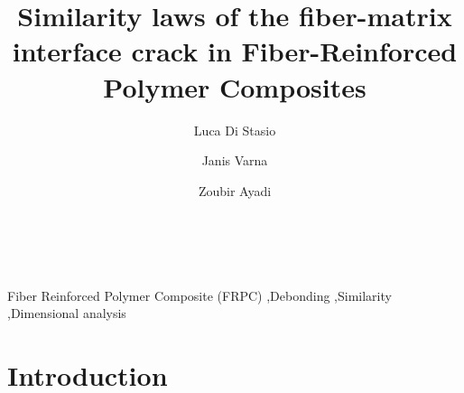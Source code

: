 \documentclass[review]{elsarticle}
\begin{document}
\begin{frontmatter}

\title{Similarity laws of the fiber-matrix interface crack in Fiber-Reinforced Polymer Composites}


\author[lulea,nancy]{Luca Di Stasio}
\author[lulea]{Janis Varna}
\author[nancy]{Zoubir Ayadi}


\address[lulea]{Lule\aa\ University of Technology, University Campus, SE-97187 Lule\aa, Sweden}
\address[nancy]{Universit\'e de Lorraine, EEIGM, IJL, 6 Rue Bastien Lepage, F-54010 Nancy, France}

\begin{abstract}
\noindent
\\
\end{abstract}

\begin{keyword}
Fiber Reinforced Polymer Composite (FRPC) \sep Debonding \sep Similarity \sep Dimensional analysis
\end{keyword}

\end{frontmatter}

\linenumbers

\section{Introduction}
\end{document}
